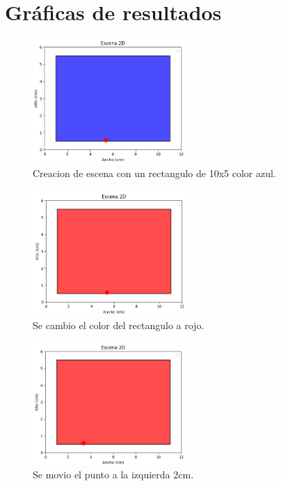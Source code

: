 \documentclass[a4paper, 10pt]{article}
\begin{document}
\section{Gráficas de resultados}\label{s:4}

\begin{figure}[H]
\centering
\includegraphics[width=5.8cm]{grafica1.png} %
    \caption{Creacion de escena con un rectangulo de 10x5 color azul.}
\label{fig:1}
\end{figure}

\begin{figure}[H]
\centering
\includegraphics[width=5.8cm]{grafica2.png} %
\caption{Se cambio el color del rectangulo a rojo.}
\label{fig:2}
\end{figure}

\begin{figure}[H]
\centering
\includegraphics[width=5.8cm]{grafica3.png} %
\caption{Se movio el punto a la izquierda 2cm.}
\label{fig:3}
\end{figure}
\end{document}
